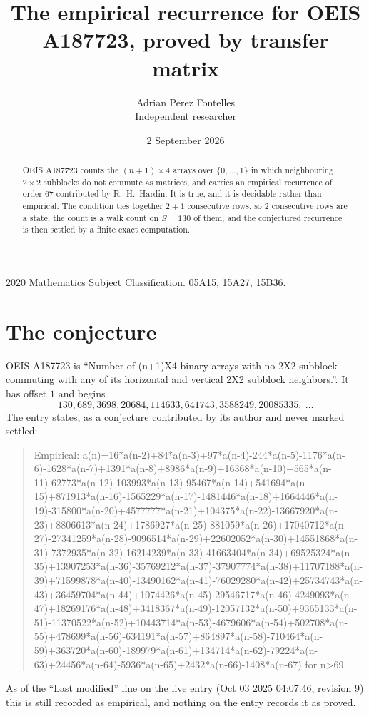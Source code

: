 \documentclass[11pt,a4paper]{article}
\title{The empirical recurrence for OEIS A187723, proved by transfer matrix}
\author{Adrian Perez Fontelles\\ \small Independent researcher}
\date{2 September 2026}
\theoremstyle{plain}
\theoremstyle{definition}
\begin{document}
\maketitle

\begin{abstract}
OEIS A187723 counts the $(n+1)\times4$ arrays over $\{0,\dots,1\}$ in which
neighbouring $2\times2$ subblocks do not commute as matrices, and carries an empirical recurrence
of order $67$ contributed by R.~H.~Hardin. It is true, and it is decidable rather than
empirical. The condition ties together $2+1$ consecutive rows, so $2$ consecutive rows are
a state, the count is a walk count on $S=130$ of them, and the conjectured recurrence is then
settled by a finite exact computation.
\end{abstract}

\noindent\small 2020 Mathematics Subject Classification. 05A15, 15A27, 15B36.\normalsize

\section{The conjecture}

OEIS A187723 is ``Number of (n+1)X4 binary arrays with no 2X2 subblock commuting with any of its horizontal and vertical 2X2 subblock neighbors.''. It has offset $1$ and begins
\[
130, 689, 3698, 20684, 114633, 641743, 3588249, 20085335,\ \dots
\]
The entry states, as a conjecture contributed by its author and never marked settled:
\begin{quote}
Empirical: a(n)=16*a(n-2)+84*a(n-3)+97*a(n-4)-244*a(n-5)-1176*a(n-6)-1628*a(n-7)+1391*a(n-8)+8986*a(n-9)+16368*a(n-10)+565*a(n-11)-62773*a(n-12)-103993*a(n-13)-95467*a(n-14)+541694*a(n-15)+871913*a(n-16)-1565229*a(n-17)-1481446*a(n-18)+1664446*a(n-19)-315800*a(n-20)+4577777*a(n-21)+104375*a(n-22)-13667920*a(n-23)+8806613*a(n-24)+1786927*a(n-25)-881059*a(n-26)+17040712*a(n-27)-27341259*a(n-28)-9096514*a(n-29)+22602052*a(n-30)+14551868*a(n-31)-7372935*a(n-32)-16214239*a(n-33)-41663404*a(n-34)+69525324*a(n-35)+13907253*a(n-36)-35769212*a(n-37)-37907774*a(n-38)+11707188*a(n-39)+71599878*a(n-40)-13490162*a(n-41)-76029280*a(n-42)+25734743*a(n-43)+36459704*a(n-44)+1074426*a(n-45)-29546717*a(n-46)-4249093*a(n-47)+18269176*a(n-48)+3418367*a(n-49)-12057132*a(n-50)+9365133*a(n-51)-11370522*a(n-52)+10443714*a(n-53)-4679606*a(n-54)+502708*a(n-55)+478699*a(n-56)-634191*a(n-57)+864897*a(n-58)-710464*a(n-59)+363720*a(n-60)-189979*a(n-61)+134714*a(n-62)-79224*a(n-63)+24456*a(n-64)-5936*a(n-65)+2432*a(n-66)-1408*a(n-67) for n>69
\end{quote}
As of the ``Last modified'' line on the live entry (Oct 03 2025 04:07:46, revision 9) this is still
recorded as empirical, and nothing on the entry records it as proved.
\end{document}
